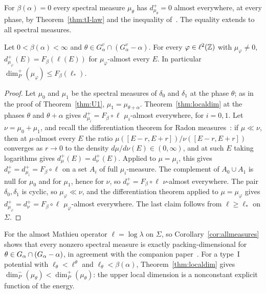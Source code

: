 For $\beta(\alpha)=0$ every spectral measure $\mu_\theta$ has $d^+_{\mu_\theta}=0$ almost everywhere, at every phase, by Theorem~\ref{thm:tI-law} and the inequality of~\cite{BGT2000}. The equality extends to all spectral measures.

\begin{corollary}\label{cor:allmeasures}
Let $0<\beta(\alpha)<\infty$ and $\theta\in G^v_\alpha\cap(G^v_\alpha-\alpha)$. For every $\varphi\in\ell^2(\mathbb Z)$ with $\mu_\varphi\ne0$, $d^+_{\mu_\varphi}(E)=F_\beta(\ell(E))$ for $\mu_\varphi$-almost every $E$. In particular $\dim_P^+(\mu_\varphi)\le F_\beta(\ell_*)$.
\end{corollary}

\begin{proof}
Let $\mu_0$ and $\mu_1$ be the spectral measures of $\delta_0$ and $\delta_1$ at the phase $\theta$; as in the proof of Theorem~\ref{thm:U1}, $\mu_1=\mu_{\theta+\alpha}$. Theorem~\ref{thm:localdim} at the phases $\theta$ and $\theta+\alpha$ gives $d^+_{\mu_i}=F_\beta\circ\ell$ $\mu_i$-almost everywhere, for $i=0,1$. Let $\nu=\mu_0+\mu_1$, and recall the differentiation theorem for Radon measures~\cite[Theorem~2.12 and Corollary~2.14]{Mattila1995}: if $\mu\ll\nu$, then at $\mu$-almost every $E$ the ratio $\mu([E-r,E+r])/\nu([E-r,E+r])$ converges as $r\to0$ to the density $d\mu/d\nu(E)\in(0,\infty)$, and at such $E$ taking logarithms gives $d^+_\mu(E)=d^+_\nu(E)$. Applied to $\mu=\mu_i$, this gives $d^+_\nu=d^+_{\mu_i}=F_\beta\circ\ell$ on a set $A_i$ of full $\mu_i$-measure. The complement of $A_0\cup A_1$ is null for $\mu_0$ and for $\mu_1$, hence for $\nu$, so $d^+_\nu=F_\beta\circ\ell$ $\nu$-almost everywhere. The pair $\delta_0,\delta_1$ is cyclic, so $\mu_\varphi\ll\nu$, and the differentiation theorem applied to $\mu=\mu_\varphi$ gives $d^+_{\mu_\varphi}=d^+_\nu=F_\beta\circ\ell$ $\mu_\varphi$-almost everywhere. The last claim follows from $\ell\ge\ell_*$ on $\Sigma$.
\end{proof}

For the almost Mathieu operator $\ell=\log\lambda$ on $\Sigma$, so Corollary~\ref{cor:allmeasures} shows that every nonzero spectral measure is exactly packing-dimensional for $\theta\in G_\alpha\cap(G_\alpha-\alpha)$, in agreement with the companion paper~\cite{DMamo}. For a type~I potential with $\ell_\theta<\ell^\theta$ and $\ell_\theta<\beta(\alpha)$, Theorem~\ref{thm:localdim} gives $\dim_P^-(\mu_\theta)<\dim_P^+(\mu_\theta)$: the upper local dimension is a nonconstant explicit function of the energy.
